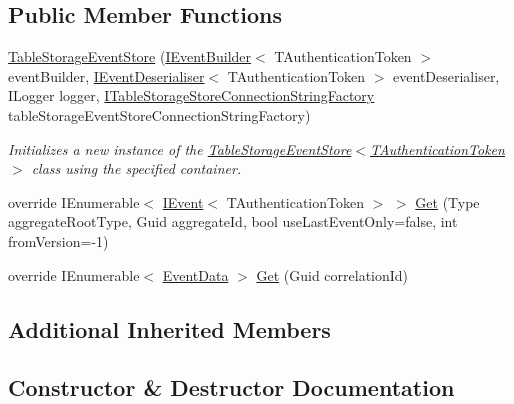 \subsection*{Public Member Functions}
\begin{DoxyCompactItemize}
\item 
\hyperlink{classCqrs_1_1Azure_1_1Storage_1_1Events_1_1TableStorageEventStore_af9497418dd323ce2a9d8615ebc7da054}{Table\+Storage\+Event\+Store} (\hyperlink{interfaceCqrs_1_1Events_1_1IEventBuilder}{I\+Event\+Builder}$<$ T\+Authentication\+Token $>$ event\+Builder, \hyperlink{interfaceCqrs_1_1Events_1_1IEventDeserialiser}{I\+Event\+Deserialiser}$<$ T\+Authentication\+Token $>$ event\+Deserialiser, I\+Logger logger, \hyperlink{interfaceCqrs_1_1Azure_1_1BlobStorage_1_1ITableStorageStoreConnectionStringFactory}{I\+Table\+Storage\+Store\+Connection\+String\+Factory} table\+Storage\+Event\+Store\+Connection\+String\+Factory)
\begin{DoxyCompactList}\small\item\em Initializes a new instance of the \hyperlink{classCqrs_1_1Azure_1_1Storage_1_1Events_1_1TableStorageEventStore_af9497418dd323ce2a9d8615ebc7da054}{Table\+Storage\+Event\+Store$<$\+T\+Authentication\+Token$>$} class using the specified container. \end{DoxyCompactList}\item 
override I\+Enumerable$<$ \hyperlink{interfaceCqrs_1_1Events_1_1IEvent}{I\+Event}$<$ T\+Authentication\+Token $>$ $>$ \hyperlink{classCqrs_1_1Azure_1_1Storage_1_1Events_1_1TableStorageEventStore_a089514182da7a70f35f9237c521c49f0}{Get} (Type aggregate\+Root\+Type, Guid aggregate\+Id, bool use\+Last\+Event\+Only=false, int from\+Version=-\/1)
\item 
override I\+Enumerable$<$ \hyperlink{classCqrs_1_1Events_1_1EventData}{Event\+Data} $>$ \hyperlink{classCqrs_1_1Azure_1_1Storage_1_1Events_1_1TableStorageEventStore_a1b436bbb111b14b85ee6ba7f90fb1a35}{Get} (Guid correlation\+Id)
\end{DoxyCompactItemize}
\subsection*{Additional Inherited Members}


\subsection{Constructor \& Destructor Documentation}
\mbox{\label{classCqrs_1_1Azure_1_1Storage_1_1Events_1_1TableStorageEventStore_af9497418dd323ce2a9d8615ebc7da054}} 
